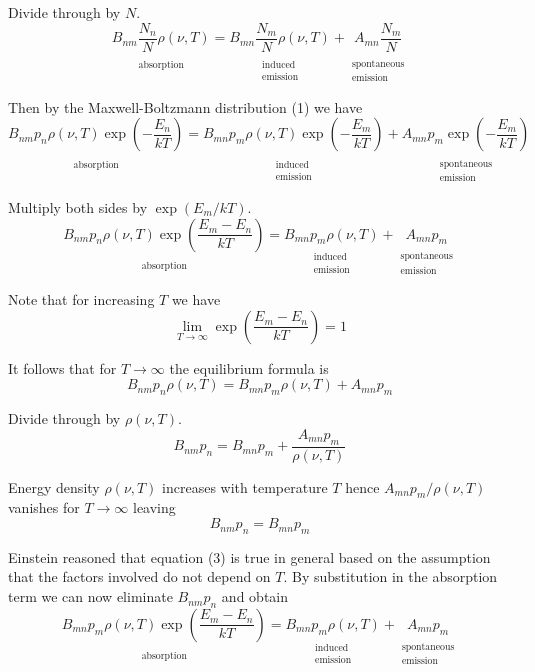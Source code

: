 \documentclass[12pt]{article}
\newcommand\BNM{B_{nm}} %
\newcommand\BMN{B_{mn}} %
\newcommand\AMN{A_{mn}} %
\newcommand\RHO{\rho(\nu,T)}
\newcommand\ABSORPTION{\substack{\\[1ex] \text{absorption}}}
\newcommand\INDUCED{\substack{\\[1ex] \text{induced}\\ \text{emission}}}
\newcommand\SPONTANEOUS{\substack{\\[1ex] \text{spontaneous}\\ \text{emission}}}
\begin{document}
\noindent
Divide through by $N$.
\begin{equation*}
\underset{\ABSORPTION}{\BNM \frac{N_n}{N} \RHO}
=\underset{\INDUCED}{\BMN \frac{N_m}{N} \RHO}
+\underset{\SPONTANEOUS}{\AMN \frac{N_m}{N}}
\end{equation*}

\noindent
Then by the Maxwell-Boltzmann distribution (1) we have
\begin{equation*}
\underset{\ABSORPTION}{\BNM p_n \RHO\exp\left(-\frac{E_n}{kT}\right)}
=\underset{\INDUCED}{\BMN p_m \RHO\exp\left(-\frac{E_m}{kT}\right)}
+\underset{\SPONTANEOUS}{\AMN p_m\exp\left(-\frac{E_m}{kT}\right)}
\tag{2}
\end{equation*}

\noindent
Multiply both sides by $\exp(E_m/kT)$.
\begin{equation*}
\underset{\ABSORPTION}{\BNM p_n \RHO\exp\left(\frac{E_m-E_n}{kT}\right)}
=\underset{\INDUCED}{\BMN p_m \RHO}
+\underset{\SPONTANEOUS}{\AMN p_m}
\end{equation*}

\noindent
Note that for increasing $T$ we have
\begin{equation*}
\lim_{T\rightarrow\infty}\exp\left(\frac{E_m-E_n}{kT}\right)=1
\end{equation*}

\noindent
It follows that for $T\rightarrow\infty$ the equilibrium formula is
\begin{equation*}
\BNM p_n \RHO
=\BMN p_m \RHO
+\AMN p_m
\end{equation*}

\noindent
Divide through by $\RHO$.
\begin{equation*}
\BNM p_n=\BMN p_m+\frac{\AMN p_m}{\RHO}
\end{equation*}

\noindent
Energy density $\RHO$ increases with temperature $T$
hence $\AMN p_m/\RHO$ vanishes for $T\rightarrow\infty$ leaving
\begin{equation*}
\BNM p_n=\BMN p_m
\tag{3}
\end{equation*}

\noindent
Einstein reasoned that equation (3) is true in general based on the assumption that
the factors involved do not depend on $T$.
By substitution in the absorption term we can now eliminate $\BNM p_n$ and obtain
\begin{equation*}
\underset{\ABSORPTION}{\BMN p_m \RHO\exp\left(\frac{E_m-E_n}{kT}\right)}
=\underset{\INDUCED}{\BMN p_m \RHO}
+\underset{\SPONTANEOUS}{\AMN p_m}
\end{equation*}
\end{document}
